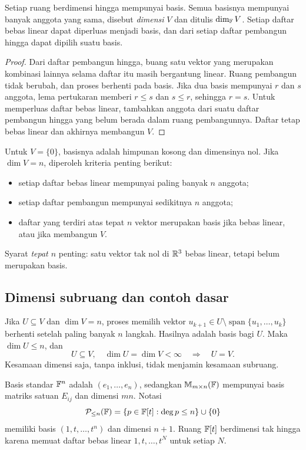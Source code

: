 \begin{teorema}
    Setiap ruang berdimensi hingga mempunyai basis. Semua
    basisnya mempunyai banyak anggota yang sama, disebut
    \emph{dimensi} $V$ dan ditulis $\dim_{\mathbb{F}}V$.
    Setiap daftar bebas linear dapat diperluas menjadi basis,
    dan dari setiap daftar pembangun hingga dapat dipilih suatu basis.
\end{teorema}
\begin{proof}
    Dari daftar pembangun hingga, buang satu vektor yang merupakan
    kombinasi lainnya selama daftar itu masih bergantung linear.
    Ruang pembangun tidak berubah, dan proses berhenti pada basis.
    Jika dua basis mempunyai $r$ dan $s$ anggota, lema pertukaran
    memberi $r\le s$ dan $s\le r$, sehingga $r=s$.
    Untuk memperluas daftar bebas linear, tambahkan anggota dari
    suatu daftar pembangun hingga yang belum berada dalam ruang
    pembangunnya. Daftar tetap bebas linear dan akhirnya membangun $V$.
\end{proof}

Untuk $V=\{0\}$, basisnya adalah himpunan kosong dan dimensinya
nol. Jika $\dim V=n$, diperoleh kriteria penting berikut:
\begin{itemize}[nosep]
    \item setiap daftar bebas linear mempunyai paling banyak $n$ anggota;
    \item setiap daftar pembangun mempunyai sedikitnya $n$ anggota;
    \item daftar yang terdiri atas tepat $n$ vektor merupakan basis
    jika bebas linear, atau jika membangun $V$.
\end{itemize}
Syarat \emph{tepat $n$} penting: satu vektor tak nol di $\mathbb{R}^3$
bebas linear, tetapi belum merupakan basis.

\subsection{Dimensi subruang dan contoh dasar}
Jika $U\subseteq V$ dan $\dim V=n$, proses memilih vektor
$u_{k+1}\in U\setminus\operatorname{span}\{u_1,\ldots,u_k\}$
berhenti setelah paling banyak $n$ langkah. Hasilnya adalah basis
bagi $U$. Maka $\dim U\le n$, dan
\[
    U\subseteq V,\quad \dim U=\dim V<\infty
    \quad\Longrightarrow\quad U=V.
\]
Kesamaan dimensi saja, tanpa inklusi, tidak menjamin kesamaan subruang.

Basis standar $\mathbb{F}^n$ adalah $(e_1,\ldots,e_n)$, sedangkan
$\mathbb{M}_{m\times n}(\mathbb{F})$ mempunyai basis matriks satuan $E_{ij}$
dan dimensi $mn$. Notasi
\[
    \mathcal P_{\le n}(\mathbb{F})=\{p\in\mathbb{F}[t]:\deg p\le n\}\cup\{0\}
\]
memiliki basis $(1,t,\ldots,t^n)$ dan dimensi $n+1$.
Ruang $\mathbb{F}[t]$ berdimensi tak hingga karena memuat daftar bebas
linear $1,t,\ldots,t^N$ untuk setiap $N$.

